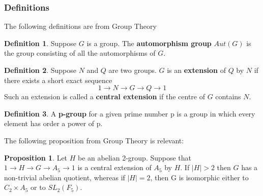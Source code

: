 \documentclass[12pt]{extarticle}
\newcommand{\<}{\langle}
\renewcommand{\>}{\rangle}
\theoremstyle{definition}
\newtheorem*{definition}{Definition}
\newtheorem{proposition}{Proposition}
\begin{document}
\subsubsection*{Definitions}
The following definitions are from Group Theory
\begin{definition}
Suppose $G$ is a group. The \textbf{automorphism group} $Aut(G)$ is the group consisting of all the automorphisms of $G$. 

\end{definition}

\begin{definition}
Suppose $N$ and $Q$ are two groups. $G$ is an \textbf{extension} of $Q$ by $N$ if there exists a short exact sequence 
\begin{equation}
1 \rightarrow N \rightarrow G \rightarrow Q \rightarrow 1 
\end{equation}
Such an extension is called a \textbf{central extension} if the centre of $G$ contains $N$. 
\end{definition}
\begin{definition}
A \textbf{p-group} for a given prime number p is a group in which every element has order a power of p.
\end{definition}
The following proposition from Group Theory is relevant:
\begin{proposition}
\label{prop:group_hardcore}
Let $H$ be an abelian 2-group. Suppose that $1 \rightarrow H \rightarrow G \rightarrow A_5 \rightarrow 1$ is a central extension of $A_5$ by $H$. If $|H| > 2$ then $G$ has a non-trivial abelian quotient, whereas if $|H|=2$, then G is isomorphic either to $C_2 \times A_5$ or to $SL_2(F_5)$.
\end{proposition}
\end{document}
